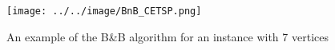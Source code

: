         \begin{figure}[H]
            \centering
            \texttt{[image: ../../image/BnB\_CETSP.png]}
            \caption{An example of the B\&B algorithm for an instance with 7 vertices}
            \label{fig:BnB_CETSP}
        \end{figure}

    
